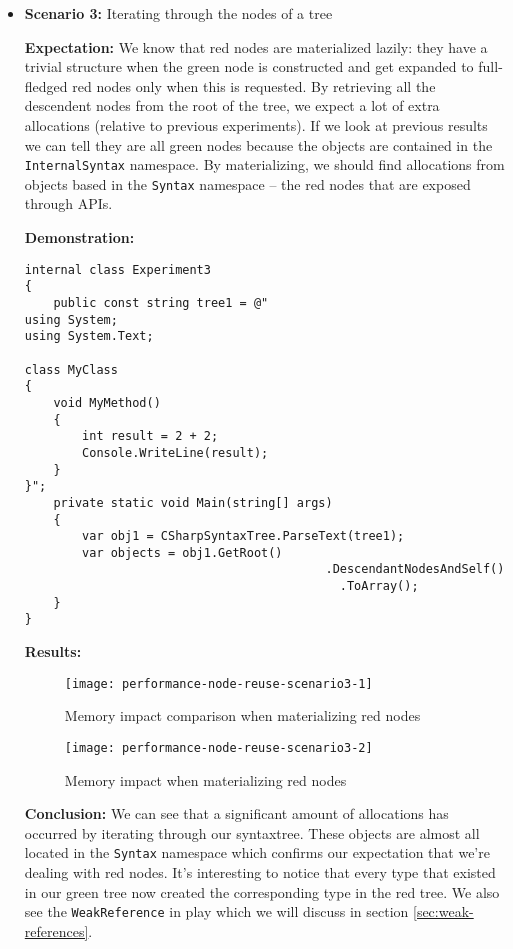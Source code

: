 \begin{itemize}
\item \textbf{Scenario 3:} Iterating through the nodes of a tree

\textbf{Expectation:} We know that red nodes are materialized lazily: they have a trivial structure when the green node is constructed and get expanded to full-fledged red nodes only when this is requested. By retrieving all the descendent nodes from the root of the tree, we expect a lot of extra allocations (relative to previous experiments). If we look at previous results we can tell they are all green nodes because the objects are contained in the \texttt{InternalSyntax} namespace. By materializing, we should find allocations from objects based in the \texttt{Syntax} namespace -- the red nodes that are exposed through APIs.

\textbf{Demonstration:} 

\begin{lstlisting}
internal class Experiment3
{
    public const string tree1 = @"
using System;
using System.Text;

class MyClass 
{
    void MyMethod()
    {
        int result = 2 + 2;
        Console.WriteLine(result);
    }
}";
    private static void Main(string[] args)
	{
		var obj1 = CSharpSyntaxTree.ParseText(tree1);
		var objects = obj1.GetRoot()
										  .DescendantNodesAndSelf()
											.ToArray();
	}
}
\end{lstlisting}

\textbf{Results:}

\begin{figure}[H]
\centering
\texttt{[image: performance-node-reuse-scenario3-1]}
\caption{Memory impact comparison when materializing red nodes}
\label{img:performance-node-reuse-scenario3-1}
\end{figure}

\begin{figure}[H]
\centering
\texttt{[image: performance-node-reuse-scenario3-2]}
\caption{Memory impact when materializing red nodes}
\label{img:performance-node-reuse-scenario3-2}
\end{figure}

\textbf{Conclusion:} We can see that a significant amount of allocations has occurred by iterating through our \gls{syntaxtree}. These objects are almost all located in the \texttt{Syntax} namespace which confirms our expectation that we're dealing with red nodes. It's interesting to notice that every type that existed in our green tree now created the corresponding type in the red tree. We also see the \texttt{WeakReference} in play which we will discuss in section \ref{sec:weak-references}.

\end{itemize}